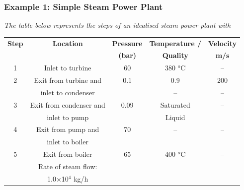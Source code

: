 \documentclass[10pt,compress,handout,ignorenonframetext]{beamer}
\begin{document}
\begin{frame}
\begin{columns}
\begin{column}[c]{0.5\linewidth}
{\begin{figure}
\begin{center}
           \end{center}
         \end{figure}}
      \end{column}
   \end{columns}
 \normalsize
\end{frame}



\begin{frame}
 \frametitle{Example 1: Simple Steam Power Plant}
    {\it The table below represents the steps of an idealised steam power plant with
    \begin{center}
     \begin{tabular}{||c | c | c | c | c ||}
      \hline\hline
       {\bf Step} & {\bf Location}       & {\bf Pressure}  & {\bf Temperature /}   & {\bf Velocity} \\
                  &                      & {\bf (bar)}     & {\bf Quality}         & {\bf m/s}      \\
      \hline\hline
          1       & Inlet to turbine     &   60            &   380 $^{o}$C          &   --           \\
      \hline
          2       & Exit from turbine and&   0.1           &   0.9                 & 200             \\
                  & inlet to condenser   &                 &    --                 &     --          \\ 
      \hline
          3       & Exit from condenser and&  0.09         &  Saturated            &   --            \\
                  & inlet to pump        &                 &  Liquid               &                 \\
      \hline
          4       & Exit from pump and   &  70             &   --                  &     --          \\
                  & inlet to boiler      &                 &                       &                 \\
      \hline 
          5       & Exit from boiler     &  65             &  400 $^{o}$C           &      --        \\
                  & Rate of steam flow:   &                 &                       &                 \\
                  & 1.0$\times$10$^{4}$ kg/h &             &                       &                 \\
     
      \hline\hline
     \end{tabular}
    \end{center}}
 \normalsize
\end{frame}
\end{document}

